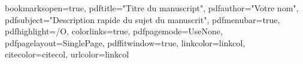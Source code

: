 \newenvironment{bulletList}%
{ \begin{list}%
	{$\bullet$}%
	{\setlength{\labelwidth}{25pt}%
	 \setlength{\leftmargin}{30pt}%
	 \setlength{\itemsep}{\parsep}}}%
{ \end{list} }


\newtheorem{definition}{Définition}
\renewcommand{\epsilon}{\varepsilon}


\newenvironment{vcenterpage}
{\newpage\vspace*{\fill}\thispagestyle{empty}\renewcommand{\headrulewidth}{0pt}}
{\vspace*{\fill}}


\ifpdf
  \usepackage[pagebackref,hyperindex=true]{hyperref}
\else
  \usepackage[dvipdfm,pagebackref,hyperindex=true]{hyperref}
\fi

\renewcommand*{\backref}[1]{}
\renewcommand*{\backrefalt}[4]{%
\ifcase #1 %
(Non cité.)%
\or
(Cité en page~#2.)%
\else
(Cité en pages~#2.)%
\fi}
\renewcommand*{\backrefsep}{, }
\renewcommand*{\backreftwosep}{ et~}
\renewcommand*{\backreflastsep}{ et~}



\hypersetup
{
bookmarksopen=true,
pdftitle="Titre du manuscript",
pdfauthor="Votre nom", %
pdfsubject="Description rapide du sujet du manuscrit", %
pdfmenubar=true, %
pdfhighlight=/O, %
colorlinks=true, %
pdfpagemode=UseNone, %
pdfpagelayout=SinglePage, %
pdffitwindow=true, %
linkcolor=linkcol, %
citecolor=citecol, %
urlcolor=linkcol %
}


\usepackage{epigraph}
\renewcommand\textflush{flushright}

